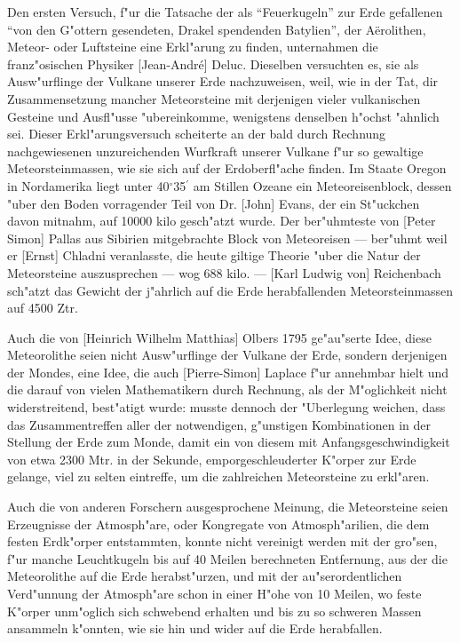 \documentclass[a4paper, 11pt, oneside]{article}
\begin{document}
Den ersten Versuch, f"ur die Tatsache der als "`Feuerkugeln"' zur Erde gefallenen "`von den G"ottern gesendeten, Drakel spendenden Batylien"', der Aërolithen, Meteor- oder Luftsteine eine Erkl"arung zu finden, unternahmen die franz"osischen Physiker [Jean-André] Deluc. Dieselben versuchten es, sie als Ausw"urflinge der Vulkane unserer Erde nachzuweisen, weil, wie in der Tat, dir Zusammensetzung mancher Meteorsteine mit derjenigen vieler vulkanischen Gesteine und Ausfl"usse "ubereinkomme, wenigstens denselben h"ochst "ahnlich sei. Dieser Erkl"arungsversuch scheiterte an der bald durch Rechnung nachgewiesenen unzureichenden Wurfkraft unserer Vulkane f"ur so gewaltige Meteorsteinmassen, wie sie sich auf der Erdoberfl"ache finden. Im Staate Oregon in Nordamerika liegt unter 40$^{\circ}$35$^{\prime}$ am Stillen Ozeane ein Meteoreisenblock, dessen "uber den Boden vorragender Teil von Dr. [John] Evans, der ein St"uckchen davon mitnahm, auf 10000 kilo gesch"atzt wurde. Der ber"uhmteste von [Peter Simon] Pallas aus Sibirien mitgebrachte Block von Meteoreisen --- ber"uhmt weil er [Ernst] Chladni veranlasste, die heute giltige Theorie "uber die Natur der Meteorsteine auszusprechen --- wog 688 kilo. --- [Karl Ludwig von] Reichenbach sch"atzt das Gewicht der j"ahrlich auf die Erde herabfallenden Meteorsteinmassen auf 4500 Ztr.

Auch die von [Heinrich Wilhelm Matthias] Olbers 1795 ge"au"serte Idee, diese Meteorolithe seien nicht Ausw"urflinge der Vulkane der Erde, sondern derjenigen der Mondes, eine Idee, die auch [Pierre-Simon] Laplace f"ur annehmbar hielt und die darauf von vielen Mathematikern durch Rechnung, als der M"oglichkeit nicht widerstreitend, best"atigt wurde: musste dennoch der "Uberlegung weichen, dass das Zusammentreffen aller der notwendigen, g"unstigen Kombinationen in der Stellung der Erde zum Monde, damit ein von diesem mit Anfangsgeschwindigkeit von etwa 2300 Mtr. in der Sekunde, emporgeschleuderter K"orper zur Erde gelange, viel zu selten eintreffe, um die zahlreichen Meteorsteine zu erkl"aren.

Auch die von anderen Forschern ausgesprochene Meinung, die Meteorsteine seien Erzeugnisse der Atmosph"are, oder Kongregate von Atmosph"arilien, die dem festen Erdk"orper entstammten, konnte nicht vereinigt werden mit der gro"sen, f"ur manche Leuchtkugeln bis auf 40 Meilen berechneten Entfernung, aus der die Meteorolithe auf die Erde herabst"urzen, und mit der au"serordentlichen Verd"unnung der Atmosph"are schon in einer H"ohe von 10 Meilen, wo feste K"orper unm"oglich sich schwebend erhalten und bis zu so schweren Massen ansammeln k"onnten, wie sie hin und wider auf die Erde herabfallen.
\end{document}

